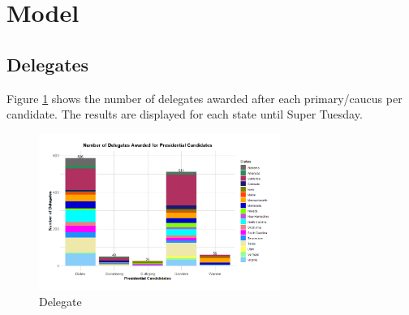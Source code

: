 \newpage
\section{Model}\label{model}
\subsection{Delegates}
Figure \ref{Delegate} shows the number of delegates awarded after each primary/caucus per candidate. The results are displayed for each state until Super Tuesday.  
\begin{figure}[H]
    \centering
    \includegraphics[width=0.7\textwidth]{figures/Delegate.png}
    \caption{Delegate}
    \label{Delegate}
\end{figure}

